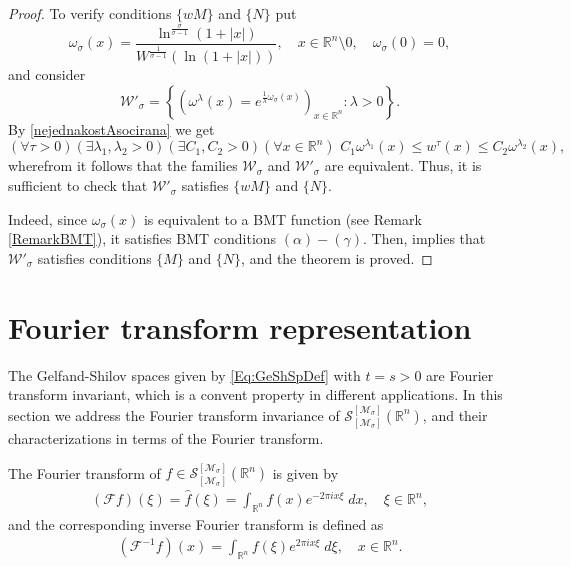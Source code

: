 \documentclass{article}
\theoremstyle{thmstyleone}
\theoremstyle{thmstyletwo}%
\theoremstyle{thmstylethree}%
\begin{document}
\begin{proof}
To verify conditions $\{wM\}$ and $\{N\}$ put 
$$ \displaystyle 
\omega_{\sigma}(x)= \frac{\ln^{\frac{\sigma}{\sigma-1}}(1+|x|)}{W^{\frac{1}{\sigma-1}}(\ln(1+|x|))}, 
\quad x\in \mathbb{R}^n \setminus 0, 
\quad \omega_{\sigma}(0)=0,
$$   
and consider
$$
\mathcal{W}'_{\sigma}=\left\{\left(\omega^{\lambda}(x)=e^{\frac{1}{\lambda}\omega_\sigma(x)}\right)_{x\in \mathbb{R}^n}\colon \lambda>0\right\}.
$$ 
By \eqref{nejednakostAsocirana} we get 
$$
(\forall \tau>0)(\exists \lambda_1, \lambda_2>0)(\exists C_1, C_2>0)(\forall x\in \mathbb{R}^n)\,\, C_1 \omega^{\lambda_1}(x) \leq w^{\tau}(x)\leq C_2\omega^{\lambda_2}(x),
$$ 
wherefrom it follows that the families $\mathcal{W}_{\sigma}$ and $\mathcal{W}'_{\sigma}$ are equivalent.
Thus, it is sufficient to check that 
$\mathcal{W}'_{\sigma}$ satisfies $\{wM\}$ and $\{N\}$.

Indeed, since $\omega_{\sigma}(x)$ is equivalent to a BMT function (see Remark \ref{RemarkBMT}), 
it satisfies BMT conditions $(\alpha)-(\gamma)$. 
Then, \cite[Lemma 3.5]{DNV2021} implies that 
$\mathcal{W}'_{\sigma}$ satisfies conditions $\{M\}$ and $\{N\}$, and the theorem is proved.
\end{proof}


\section{Fourier transform representation}  \label{Sec3}

The Gelfand-Shilov spaces given by \eqref{Eq:GeShSpDef} with
$t= s > 0$ are Fourier transform invariant, which is a convent property in different applications. In this section we address the Fourier transform invariance of $\mathcal S_{[\mathcal{M}_\sigma]}^{[\mathcal{M}_\sigma]} (\mathbb R^n)$, and their 
characterizations in terms of 
the Fourier transform. 

The Fourier transform %
of $f \in \mathcal S_{[\mathcal{M}_\sigma]}^{[\mathcal{M}_\sigma]} (\mathbb R^n)$ 
is given by
\begin{align*}
    (\mathcal{F}f)(\xi)=\hat f(\xi)=\int_{\mathbb R^n}f(x)e^{-2\pi ix\xi}\;dx,\quad \xi\in \mathbb R^n,
\end{align*}
and the corresponding inverse Fourier transform  is defined as
\begin{align*}
    (\mathcal{F}^{-1}f)(x)=\int_{\mathbb R^n}f(\xi)e^{2\pi ix\xi}\;d\xi,\quad x\in \mathbb R^n.
\end{align*}
\end{document}
